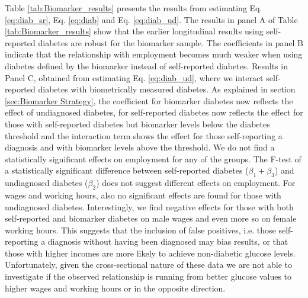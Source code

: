 \documentclass[12pt,english]{article}
\begin{document}
Table \ref{tab:Biomarker_results} presents the results from estimating Eq. \ref{eq:diab_sr}, Eq. \ref{eq:diab} and Eq. \ref{eq:diab_ud}.  
The results in panel A of Table \ref{tab:Biomarker_results} show that the earlier longitudinal results using self-reported diabetes are robust for the biomarker sample. The coefficients in panel B indicate that the relationship with employment becomes much weaker when using diabetes defined by the biomarker instead of self-reported diabetes. Results in Panel C, obtained from estimating Eq. \ref{eq:diab_ud}, where we interact self-reported diabetes with biometrically measured diabetes. As explained in section \ref{sec:Biomarker Strategy}, the coefficient for biomarker diabetes now reflects the effect of undiagnosed diabetes, for self-reported diabetes now reflects the effect for those with self-reported diabetes but biomarker levels below the diabetes threshold and the interaction term shows the effect for those self-reporting a diagnosis and with biomarker levels above the threshold. We do not find a statistically significant effects on employment for any of the groups. The F-test of a statistically significant difference between self-reported diabetes ($\beta_{1} + \beta_{3}$) and undiagnosed diabetes ($\beta_{2}$) does not suggest different effects on employment. For wages and working hours, also no significant effects are found for those with undiagnosed diabetes. Interestingly, we find negative effects for those with both self-reported and biomarker diabetes on male wages and even more so on female working hours. This suggests that the inclusion of false positives, i.e. those self-reporting a diagnosis without having been diagnosed may bias results, or that those with higher incomes are more likely to achieve non-diabetic glucose levels. Unfortunately, given the cross-sectional nature of these data we are not able to investigate if the observed relationship is running from better glucose values to higher wages and working hours or in the opposite direction.
\end{document}
